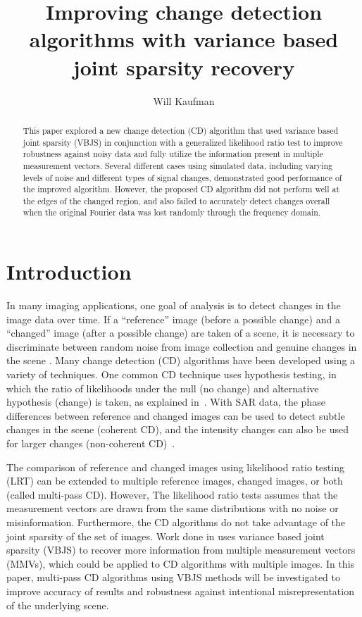 \documentclass{article}
\title{Improving change detection algorithms with variance based joint sparsity recovery}
\author{Will Kaufman%
}
\begin{document}
\maketitle


\begin{abstract}
This paper explored a new change detection (CD) algorithm that used variance based joint sparsity (VBJS) in conjunction with a generalized likelihood ratio test to improve robustness against noisy data and fully utilize the information present in multiple measurement vectors. Several different cases using simulated data, including varying levels of noise and different types of signal changes, demonstrated good performance of the improved algorithm.
However, the proposed CD algorithm did not perform well at the edges of the changed region, and also failed to accurately detect changes overall when the original Fourier data was lost randomly through the frequency domain.
\end{abstract}


\section{Introduction}

In many imaging applications, one goal of analysis is to detect changes in the image data over time. If a ``reference'' image (before a possible change) and a ``changed'' image (after a possible change) are taken of a scene, it is necessary to discriminate between random noise from image collection and genuine changes in the scene%
. Many change detection (CD) algorithms have been developed using a variety of techniques. One common CD technique uses hypothesis testing, in which the ratio of likelihoods under the null (no change) and alternative hypothesis (change) is taken, as explained in~\cite{novak_2005}. With SAR data, the phase differences between reference and changed images can be used to detect subtle changes in the scene (coherent CD), and the intensity changes can also be used for larger changes (non-coherent CD)~\cite{Ash_2014}.

The comparison of reference and changed images using likelihood ratio testing (LRT) can be extended to multiple reference images, changed images, or both (called multi-pass CD). However, The likelihood ratio tests assumes that the measurement vectors are drawn from the same distributions with no noise or misinformation. Furthermore, the CD algorithms do not take advantage of the joint sparsity of the set of images. Work done in \cite{gelb_2018} uses variance based joint sparsity (VBJS) to recover more information from multiple measurement vectors (MMVs), which could be applied to CD algorithms with multiple images. In this paper, multi-pass CD algorithms using VBJS methods will be investigated to improve accuracy of results and robustness against intentional misrepresentation of the underlying scene.
\end{document}
